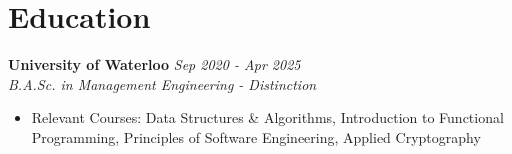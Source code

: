 \section*{Education}

\noindent\textbf{\large\color{sectioncolor}University of Waterloo} \hfill \textit{Sep 2020 - Apr 2025} \\
\textit{B.A.Sc. in Management Engineering - Distinction}
\begin{itemize}[leftmargin=1.5em, itemsep=0em, topsep=0.2em, parsep=0em]
    \item Relevant Courses: Data Structures \& Algorithms, Introduction to Functional Programming, Principles of Software Engineering, Applied Cryptography
\end{itemize} 
